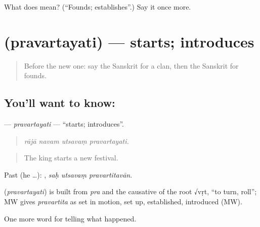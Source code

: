\begin{tcolorbox}[breakable,colback=teal!4,colframe=teal!35!black,title={Before you move on}]
What does  mean? (\textquotedblleft{}Founds; establishes\textquotedblright{}.) Say it once more.
\end{tcolorbox}
\section[\texorpdfstring{\sk{प्रवर्तयति} (pravartayati)}{प्रवर्तयति (pravartayati)}]{ (pravartayati) — starts; introduces}

\label{lesson:SA-C322-pravartayati}



\begin{quote}
Before the new one: say the Sanskrit for a clan, then the Sanskrit for founds.
\end{quote}

\subsection*{You'll want to know: }
\textbf{} — \emph{pravartayati} — \textquotedblleft{}starts; introduces\textquotedblright{}.

\begin{quote}
   
\end{quote}

\begin{quote}
\emph{rājā navam utsavaṃ pravartayati.}
\end{quote}

\begin{quote}
The king starts a new festival.
\end{quote}

Past (he …):   , \emph{saḥ utsavaṃ pravartitavān}.

\begin{cousinweb}
\textbf{} (\emph{pravartayati}) is built from \emph{pra} and the causative of the root √vṛt, \textquotedblleft{}to turn, roll\textquotedblright{}; MW gives \emph{pravartita} as set in motion, set up, established, introduced (MW).
\end{cousinweb}

\begin{grammarlens}[title={What you've built}]
One more word for telling what happened.
\end{grammarlens}

